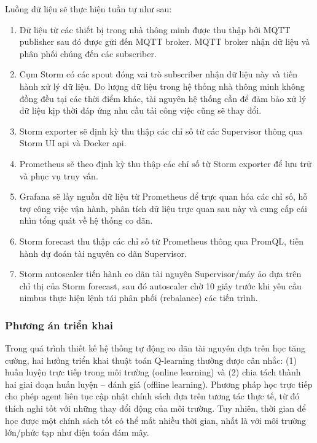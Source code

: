 Luồng dữ liệu sẽ thực hiện tuần tự như sau:

\begin{enumerate}
    \item Dữ liệu từ các thiết bị trong nhà thông minh được thu thập bởi MQTT publisher sau đó được gửi đến MQTT broker. MQTT broker nhận dữ liệu và phân phối chúng đến các subscriber.
    \item Cụm Storm có các spout đóng vai trò subscriber nhận dữ liệu này và tiến hành xử lý dữ liệu. Do lượng dữ liệu trong hệ thống nhà thông minh không đồng đều tại các thời điểm khác, tài nguyên hệ thống cần để đảm bảo xử lý dữ liệu kịp thời đáp ứng nhu cầu tải công việc cũng sẽ thay đổi.
    \item Storm exporter sẽ định kỳ thu thập các chỉ số từ các Supervisor thông qua Storm UI \acrshort{api} và Docker \acrshort{api}.
    \item Prometheus sẽ theo định kỳ thu thập các chỉ số từ Storm exporter để lưu trữ và phục vụ truy vấn.
    \item Grafana sẽ lấy nguồn dữ liệu từ Prometheus để trực quan hóa các chỉ số, hỗ trợ công việc vận hành, phân tích dữ liệu trực quan sau này và cung cấp cái nhìn tổng quát về hệ thống co dãn.
    \item Storm forecast thu thập các chỉ số từ Prometheus thông qua PromQL, tiến hành dự đoán tài nguyên co dãn Supervisor.
    \item Storm autoscaler tiến hành co dãn tài nguyên Supervisor/máy ảo dựa trên chỉ thị của Storm forecast, sau đó autoscaler chờ 10 giây trước khi yêu cầu nimbus thực hiện lệnh tái phân phối (rebalance) các tiến trình.
\end{enumerate}

\subsubsection{Phương án triển khai}

Trong quá trình thiết kế hệ thống tự động co dãn tài nguyên dựa trên học tăng cường, hai hướng triển khai thuật toán Q-learning thường được cân nhắc: (1) huấn luyện trực tiếp trong môi trường (online learning) và (2) chia tách thành hai giai đoạn huấn luyện – đánh giá (offline learning). Phương pháp học trực tiếp cho phép agent liên tục cập nhật chính sách dựa trên tương tác thực tế, từ đó thích nghi tốt với những thay đổi động của môi trường. Tuy nhiên, thời gian để học được một chính sách tốt có thể mất nhiều thời gian, nhất là với môi trường lớn/phức tạp như điện toán đám mây.

